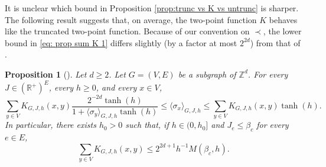 \documentclass[11pt,a4paper]{article}
\numberwithin{equation}{section}
\theoremstyle{plain}
\newtheorem{Prop}[Thm]{Proposition}
\theoremstyle{definition}
\begin{document}
It is unclear which bound in Proposition \ref{prop:trunc vs K vs untrunc} is sharper. The following result suggests that, on average, the two-point function $K$ behaves like the truncated two-point function. Because of our convention on $\prec$, the lower bound in \eqref{eq: prop sum K 1} differs slightly (by a factor at most $2^{2d}$) from that of \cite{AizenmanFernandezCriticalBehaviorMagnetization1986}.
\begin{Prop}[{\hspace{1pt}\cite[Proposition~4.8]{AizenmanFernandezCriticalBehaviorMagnetization1986}}]\label{prop: sum of K} Let $d\geq 2$. Let $G=(V,E)$ be a subgraph of $\mathbb Z^d$. For every $J\in (\mathbb R^+)^E$, every $h\geq 0$, and every $x\in V$,
\begin{equation}\label{eq: prop sum K 1}
	\sum_{y\in V}K_{G,J,h}(x,y)\frac{2^{-2d}\tanh(h)}{1+\langle \sigma_y\rangle_{G,J,h}\tanh(h)}\leq \langle \sigma_x\rangle_{G,J,h}\leq \sum_{y\in V}K_{G,J,h}(x,y)\tanh(h).
\end{equation}
In particular, there exists $h_0>0$ such that, if $h\in (0,h_0]$ and $J_e\leq \beta_c$ for every $e\in E$,  
\begin{equation}\label{eq: prop sum K 2}
	\sum_{y\in V}K_{G,J,h}(x,y)\leq 2^{2d+1}h^{-1}M(\beta_c,h). 
\end{equation}
\end{Prop}
\end{document}
